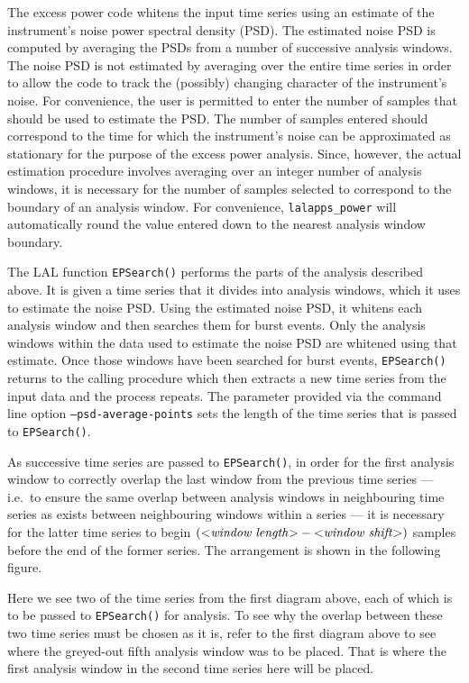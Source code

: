 \documentclass{article}
\newcommand{\prog}[1]{\texttt{#1}}
\newcommand{\function}[1]{\texttt{#1}}
\newcommand{\option}[1]{\texttt{#1}}
\newcommand{\parm}[1]{$<$\textit{#1}$>$}
\begin{document}
The excess power code whitens the input time series using an estimate of
the instrument's noise power spectral density (PSD).  The estimated noise
PSD is computed by averaging the PSDs from a number of successive analysis
windows.  The noise PSD is not estimated by averaging over the entire time
series in order to allow the code to track the (possibly) changing
character of the instrument's noise.  For convenience, the user is
permitted to enter the number of samples that should be used to estimate
the PSD.  The number of samples entered should correspond to the time for
which the instrument's noise can be approximated as stationary for the
purpose of the excess power analysis.  Since, however, the actual
estimation procedure involves averaging over an integer number of analysis
windows, it is necessary for the number of samples selected to correspond
to the boundary of an analysis window.  For convenience,
\prog{lalapps\_power} will automatically round the value entered down to
the nearest analysis window boundary.

The LAL function \function{EPSearch()} performs the parts of the analysis
described above.  It is given a time series that it divides into analysis
windows, which it uses to estimate the noise PSD.  Using the estimated
noise PSD, it whitens each analysis window and then searches them for burst
events.  Only the analysis windows within the data used to estimate the
noise PSD are whitened using that estimate.  Once those windows have been
searched for burst events, \function{EPSearch()} returns to the calling
procedure which then extracts a new time series from the input data and the
process repeats.  The parameter provided via the command line option
\option{--psd-average-points} sets the length of the time series that is
passed to \function{EPSearch()}.

As successive time series are passed to \function{EPSearch()}, in order for
the first analysis window to correctly overlap the last window from the
previous time series --- i.e.\ to ensure the same overlap between analysis
windows in neighbouring time series as exists between neighbouring windows
within a series --- it is necessary for the latter time series to begin
$(\mbox{\parm{window length}} - \mbox{\parm{window shift}})$ samples before
the end of the former series.  The arrangement is shown in the following
figure.
\begin{center}

\end{center}
Here we see two of the time series from the first diagram above, each of
which is to be passed to \function{EPSearch()} for analysis.  To see why
the overlap between these two time series must be chosen as it is, refer to
the first diagram above to see where the greyed-out fifth analysis window
was to be placed.  That is where the first analysis window in the second
time series here will be placed.
\end{document}
